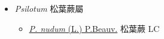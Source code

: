 
  \begin{itemize}
 \item[] \textit{Psilotum} 松葉蕨屬
                    
  \begin{itemize}
        \item[] \href{http://www.theplantlist.org/tpl1.1/search?q=Psilotum+nudum}{\textit{P. nudum} (L.) P.Beauv.}   松葉蕨 LC
  \end{itemize}
  \end{itemize}
